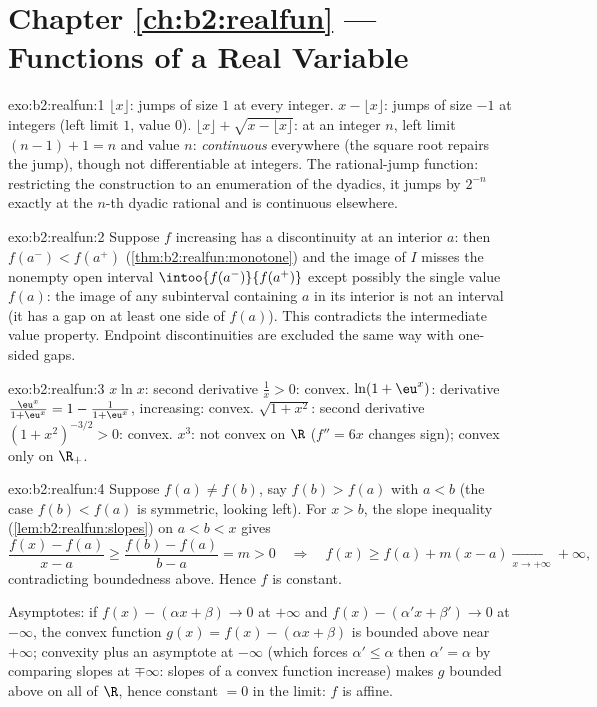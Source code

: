 \section*{Chapter \ref{ch:b2:realfun} --- Functions of a Real Variable}

\begin{solution}{exo:b2:realfun:1}
$\lfloor x\rfloor$: jumps of size $1$ at every integer. $x -
\lfloor x\rfloor$: jumps of size $-1$ at integers (left limit $1$,
value $0$). $\lfloor x\rfloor + \sqrt{x - \lfloor x\rfloor}$: at an
integer $n$, left limit $(n - 1) + 1 = n$ and value $n$:
\emph{continuous} everywhere (the square root repairs the jump),
though not differentiable at integers. The rational-jump function:
restricting the construction to an enumeration of the dyadics, it
jumps by $2^{-n}$ exactly at the $n$-th dyadic rational and is
continuous elsewhere.
\end{solution}

\begin{solution}{exo:b2:realfun:2}
Suppose $f$ increasing has a discontinuity at an interior $a$: then
$f(a^-) < f(a^+)$ (\cref{thm:b2:realfun:monotone}) and the image
of $I$ misses the nonempty open interval
$\intoo{f(a^-)}{f(a^+)}$ except possibly the single value $f(a)$:
the image of any subinterval containing $a$ in its interior is not
an interval (it has a gap on at least one side of $f(a)$). This
contradicts the intermediate value property. Endpoint
discontinuities are excluded the same way with one-sided gaps.
\end{solution}

\begin{solution}{exo:b2:realfun:3}
$x\ln x$: second derivative $\frac1x > 0$: convex. $\ln(1 +
\eu^x)$: derivative $\frac{\eu^x}{1 + \eu^x} = 1 - \frac{1}{1 +
\eu^x}$, increasing: convex. $\sqrt{1 + x^2}$: second derivative
$(1 + x^2)^{-3/2} > 0$: convex. $x^3$: not convex on $\R$ ($f'' =
6x$ changes sign); convex only on $\R_+$.
\end{solution}

\begin{solution}{exo:b2:realfun:4}
Suppose $f(a) \neq f(b)$, say $f(b) > f(a)$ with $a < b$ (the case
$f(b) < f(a)$ is symmetric, looking left). For $x > b$, the slope
inequality (\cref{lem:b2:realfun:slopes}) on $a < b < x$ gives
\[
\frac{f(x) - f(a)}{x - a} \geq \frac{f(b) - f(a)}{b - a} = m > 0
\quad\Longrightarrow\quad
f(x) \geq f(a) + m(x - a) \xrightarrow[x\to+\infty]{} +\infty,
\]
contradicting boundedness above. Hence $f$ is constant.

Asymptotes: if $f(x) - (\alpha x + \beta) \to 0$ at $+\infty$ and
$f(x) - (\alpha' x + \beta') \to 0$ at $-\infty$, the convex
function $g(x) = f(x) - (\alpha x + \beta)$ is bounded above near
$+\infty$; convexity plus an asymptote at $-\infty$ (which forces
$\alpha' \leq \alpha$ then $\alpha' = \alpha$ by comparing slopes at
$\mp\infty$: slopes of a convex function increase) makes $g$
bounded above on all of $\R$, hence constant $= 0$ in the limit: $f$
is affine.
\end{solution}


